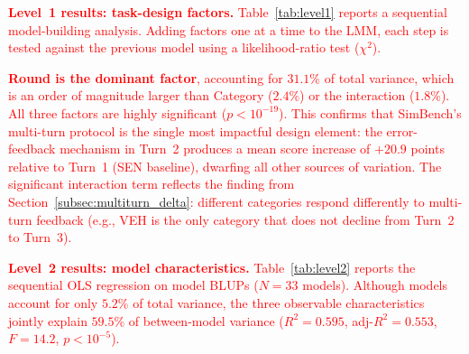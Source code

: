 \documentclass{ieeeaccess}
\newcommand{\updatedText}[1]{\textcolor{red}{#1}}
\newcommand{\noindentBold}[1]{\par\noindent\textbf{#1}}
\begin{document}
\medskip
\updatedText{\noindentBold{Level~1 results: task-design factors.}
Table~\ref{tab:level1} reports a sequential model-building analysis.
Adding factors one at a time to the LMM, each step is tested against the
previous model using a likelihood-ratio test ($\chi^2$).}

\begin{table}[htbp]
\centering
\updatedText{\caption{Level~1 sequential model building. Each row adds one factor to
the previous LMM. $\Delta R^2_m$: incremental marginal $R^2$
(Nakagawa--Schielzeth). LRT: likelihood-ratio test against the preceding
model.}\label{tab:level1}}
\end{table}

\updatedText{\textbf{Round is the dominant factor}, accounting for $31.1\%$ of total
variance, which is an order of magnitude larger than Category ($2.4\%$) or the
interaction ($1.8\%$).  All three factors are highly significant
($p < 10^{-19}$).  This confirms that SimBench's multi-turn protocol is
the single most impactful design element: the error-feedback mechanism in
Turn~2 produces a mean score increase of $+20.9$ points relative to
Turn~1 (SEN baseline), dwarfing all other sources of variation.
The significant interaction term reflects the finding from
Section~\ref{subsec:multiturn_delta}: different categories respond
differently to multi-turn feedback (e.g., VEH is the only category that
does not decline from Turn~2 to Turn~3).}

\medskip
\updatedText{\noindentBold{Level~2 results: model characteristics.}
Table~\ref{tab:level2} reports the sequential OLS regression on model
BLUPs ($N = 33$ models).
Although models account for only $5.2\%$ of total variance, the
three observable characteristics jointly explain
$\boldsymbol{59.5\%}$ of between-model variance
($R^2 = 0.595$, adj-$R^2 = 0.553$, $F = 14.2$, $p < 10^{-5}$).}
\end{document}
